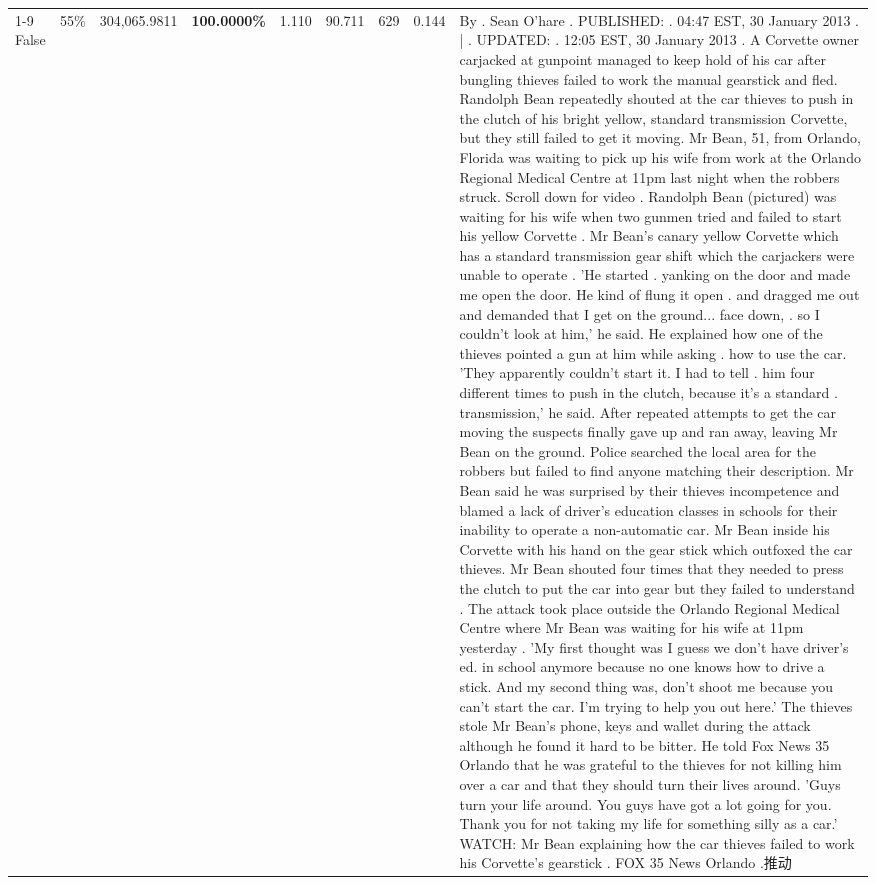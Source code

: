 \begin{table}[H]
\begin{tabular}{lllrlllll}
\cline{1-9} \cline{2-9}
False & 55\% & 304,065.9811 & \bfseries \color{red} 100.0000\% & 1.110 & 90.711 & 629 & 0.144 & By . Sean O'hare . PUBLISHED: . 04:47 EST, 30 January 2013 . | . UPDATED: . 12:05 EST, 30 January 2013 . A Corvette owner carjacked at gunpoint managed to keep hold of his car after bungling thieves failed to work the manual gearstick and fled. Randolph Bean repeatedly shouted at the car thieves to push in the clutch of his bright yellow, standard transmission Corvette, but they still failed to get it moving. Mr Bean, 51, from Orlando, Florida was waiting to pick up his wife from work at the Orlando Regional Medical Centre at 11pm last night when the robbers struck. Scroll down for video . Randolph Bean (pictured) was waiting for his wife when two gunmen tried and failed to start his yellow Corvette . Mr Bean's canary yellow Corvette which has a standard transmission gear shift which the carjackers were unable to operate . 'He started . yanking on the door and made me open the door. He kind of flung it open . and dragged me out and demanded that I get on the ground... face down, . so I couldn't look at him,' he said. He explained how one of the thieves pointed a gun at him while asking . how to use the car. 'They apparently couldn't start it. I had to tell . him four different times to push in the clutch, because it's a standard . transmission,' he said. After repeated attempts to get the car moving the suspects finally gave up and ran away, leaving Mr Bean on the ground. Police searched the local area for the robbers but failed to find anyone matching their description. Mr Bean said he was surprised by their thieves incompetence and blamed a lack of driver's education classes in schools for their inability to operate a non-automatic car. Mr Bean inside his Corvette with his hand on the gear stick which outfoxed the car thieves. Mr Bean shouted four times that they needed to press the clutch to put the car into gear but they failed to understand . The attack took place outside the Orlando Regional Medical Centre where Mr Bean was waiting for his wife at 11pm yesterday . 'My first thought was I guess we don't have driver's ed. in school anymore because no one knows how to drive a stick. And my second thing was, don't shoot me because you can't start the car. I'm trying to help you out here.' The thieves stole Mr Bean's phone, keys and wallet during the attack although he found it hard to be bitter. He told Fox News 35 Orlando that he was grateful to the thieves for not killing him over a car and that they should turn their lives around. 'Guys turn your life around. You guys have got a lot going for you. Thank you for not taking my life for something silly as a car.' WATCH: Mr Bean explaining how the car thieves failed to work his Corvette's gearstick . FOX 35 News Orlando .推动 \\

\end{tabular}
\end{table}
